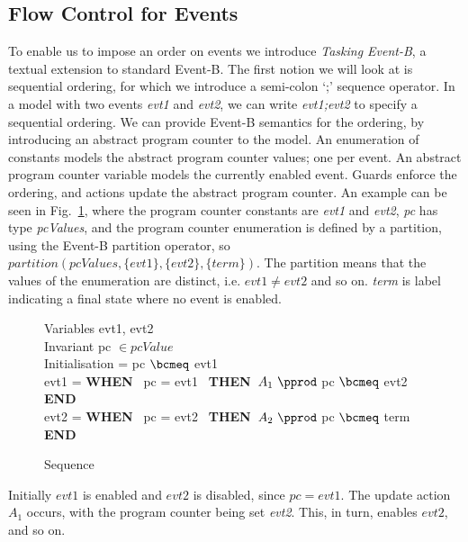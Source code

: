  
\subsection{Flow Control for Events}\label{flow}
To enable us to impose an order on events we introduce \emph{Tasking Event-B}, a textual extension to standard Event-B. The first notion we will look at is sequential ordering, for which we introduce a semi-colon `;' sequence operator. In a model with two events \emph{evt1} and \emph{evt2}, we can write \emph{evt1;evt2} to specify a sequential ordering. We can provide Event-B semantics for the ordering, by introducing an abstract program counter to the model. An enumeration of constants models the abstract program counter values; one per event. An abstract program counter variable models the currently enabled event. Guards enforce the ordering, and actions update the abstract program counter. An example can be seen in Fig.~\ref{fig:seq}, where the program counter constants are \emph{evt1} and \emph{evt2}, \emph{pc} has type \emph{pcValues}, and the program counter enumeration is defined by a partition, using the Event-B partition operator, so $partition(pcValues, \{evt1\}, \{evt2\},\{term\})$. The partition means that the values of the enumeration are distinct, i.e. $evt1 \neq evt2$ and so on. \emph{term} is label indicating a final state where no event is enabled.
%
\begin{figure}
\centering
\begin{minipage}{0.7\textwidth}
Variables evt1, evt2\\
Invariant pc $\in pcValue$ \\
Initialisation = pc $\bcmeq$ evt1 \\
evt1 = \textbf{WHEN}~ pc = evt1~ \textbf{THEN}~$A_1~ \pprod$ pc $\bcmeq$ evt2 \textbf{END}\\
evt2 = \textbf{WHEN}~ pc = evt2~ \textbf{THEN}~$A_2~ \pprod$ pc $\bcmeq$ term \textbf{END}\\
\end{minipage}
\caption{Sequence}
\label{fig:seq}
\end{figure}
Initially $evt1$ is enabled and $evt2$ is disabled, since $pc = evt1$. The update action $A_1$ occurs, with the program counter being set \emph{evt2}. This, in turn, enables $evt2$, and so on.
